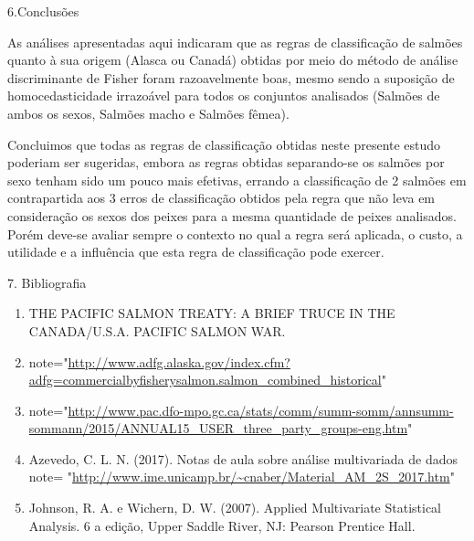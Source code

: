 \documentclass[10pt,portuguese,]{article}
\begin{document}
\newpage

\vspace{0.5cm} 6.Conclusões

\vspace{0.5cm}

As análises apresentadas aqui indicaram que as regras de classificação
de salmões quanto à sua origem (Alasca ou Canadá) obtidas por meio do
método de análise discriminante de Fisher foram razoavelmente boas,
mesmo sendo a suposição de homocedasticidade irrazoável para todos os
conjuntos analisados (Salmões de ambos os sexos, Salmões macho e Salmões
fêmea).

Concluimos que todas as regras de classificação obtidas neste presente
estudo poderiam ser sugeridas, embora as regras obtidas separando-se os
salmões por sexo tenham sido um pouco mais efetivas, errando a
classificação de 2 salmões em contrapartida aos 3 erros de classificação
obtidos pela regra que não leva em consideração os sexos dos peixes para
a mesma quantidade de peixes analisados. Porém deve-se avaliar sempre o
contexto no qual a regra será aplicada, o custo, a utilidade e a
influência que esta regra de classificação pode exercer.

\vspace{0.5cm} 7. Bibliografia \vspace{0.5cm}

\begin{enumerate}
  \item THE PACIFIC SALMON TREATY: A BRIEF TRUCE IN THE CANADA/U.S.A. PACIFIC SALMON WAR.

  \item note="\url{http://www.adfg.alaska.gov/index.cfm?adfg=commercialbyfisherysalmon.salmon_combined_historical}"

  \item note="\url{http://www.pac.dfo-mpo.gc.ca/stats/comm/summ-somm/annsumm-sommann/2015/ANNUAL15_USER_three_party_groups-eng.htm}"

  \item Azevedo, C. L. N. (2017). Notas de aula sobre análise multivariada de dados note= "\url{http://www.ime.unicamp.br/~cnaber/Material_AM_2S_2017.htm}" 

  \item Johnson, R. A. e Wichern, D. W. (2007). Applied Multivariate Statistical Analysis. 6 a edição, Upper Saddle River, NJ: Pearson Prentice Hall.
  
\end{enumerate}
\end{document}
